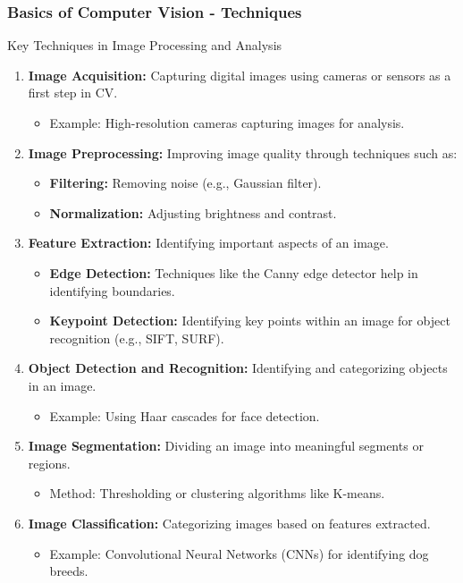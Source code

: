 \documentclass[aspectratio=169]{beamer}
\begin{document}
\begin{frame}[fragile]
    \frametitle{Basics of Computer Vision - Techniques}
    \begin{block}{Key Techniques in Image Processing and Analysis}
        \begin{enumerate}
            \item \textbf{Image Acquisition:} Capturing digital images using cameras or sensors as a first step in CV.
                \begin{itemize}
                    \item Example: High-resolution cameras capturing images for analysis.
                \end{itemize}
            \item \textbf{Image Preprocessing:} Improving image quality through techniques such as:
                \begin{itemize}
                    \item \textbf{Filtering:} Removing noise (e.g., Gaussian filter).
                    \item \textbf{Normalization:} Adjusting brightness and contrast.
                \end{itemize}
            \item \textbf{Feature Extraction:} Identifying important aspects of an image.
                \begin{itemize}
                    \item \textbf{Edge Detection:} Techniques like the Canny edge detector help in identifying boundaries.
                    \item \textbf{Keypoint Detection:} Identifying key points within an image for object recognition (e.g., SIFT, SURF).
                \end{itemize}
            \item \textbf{Object Detection and Recognition:} Identifying and categorizing objects in an image.
                \begin{itemize}
                    \item Example: Using Haar cascades for face detection.
                \end{itemize}
            \item \textbf{Image Segmentation:} Dividing an image into meaningful segments or regions.
                \begin{itemize}
                    \item Method: Thresholding or clustering algorithms like K-means.
                \end{itemize}
            \item \textbf{Image Classification:} Categorizing images based on features extracted. 
                \begin{itemize}
                    \item Example: Convolutional Neural Networks (CNNs) for identifying dog breeds.
                \end{itemize}
        \end{enumerate}
    \end{block}
\end{frame}
\end{document}
